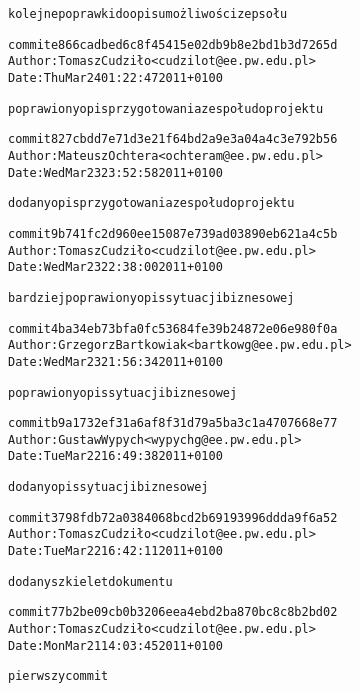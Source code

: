 \documentclass[10pt,a4paper]{article}
\begin{document}
\begin{alltt}
    kolejne poprawki do opisu możliwości zepsołu

commit e866cadbed6c8f45415e02db9b8e2bd1b3d7265d
Author: Tomasz Cudziło <cudzilot@ee.pw.edu.pl>
Date:   Thu Mar 24 01:22:47 2011 +0100

    poprawiony opis przygotowania zespołu do projektu

commit 827cbdd7e71d3e21f64bd2a9e3a04a4c3e792b56
Author: Mateusz Ochtera <ochteram@ee.pw.edu.pl>
Date:   Wed Mar 23 23:52:58 2011 +0100

    dodany opis przygotowania zespołu do projektu

commit 9b741fc2d960ee15087e739ad03890eb621a4c5b
Author: Tomasz Cudziło <cudzilot@ee.pw.edu.pl>
Date:   Wed Mar 23 22:38:00 2011 +0100

    bardziej poprawiony opis sytuacji biznesowej

commit 4ba34eb73bfa0fc53684fe39b24872e06e980f0a
Author: Grzegorz Bartkowiak <bartkowg@ee.pw.edu.pl>
Date:   Wed Mar 23 21:56:34 2011 +0100

    poprawiony opis sytuacji biznesowej

commit b9a1732ef31a6af8f31d79a5ba3c1a4707668e77
Author: Gustaw Wypych <wypychg@ee.pw.edu.pl>
Date:   Tue Mar 22 16:49:38 2011 +0100

    dodany opis sytuacji biznesowej

commit 3798fdb72a0384068bcd2b69193996ddda9f6a52
Author: Tomasz Cudziło <cudzilot@ee.pw.edu.pl>
Date:   Tue Mar 22 16:42:11 2011 +0100

    dodany szkielet dokumentu

commit 77b2be09cb0b3206eea4ebd2ba870bc8c8b2bd02
Author: Tomasz Cudziło <cudzilot@ee.pw.edu.pl>
Date:   Mon Mar 21 14:03:45 2011 +0100

    pierwszy commit
\end{alltt}
\end{document}
